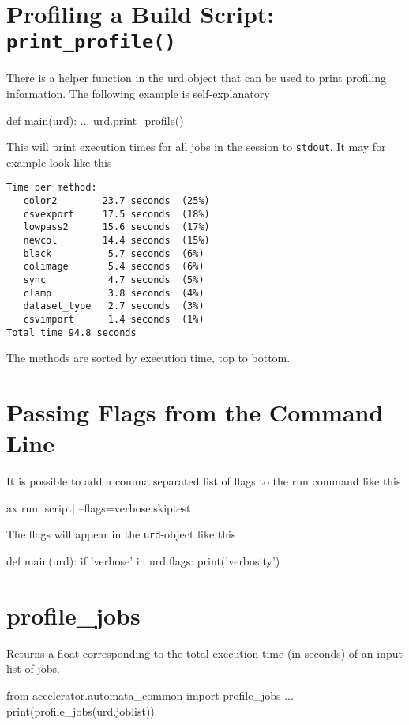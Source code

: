 \section{Profiling a Build Script:  \texttt{print\_profile()}}
There is a helper function in the urd object that can be used to print
profiling information.  The following example is self-explanatory
\begin{python}
def main(urd):
    ...
    urd.print_profile()
\end{python}
This will print execution times for all jobs in the session
to \texttt{stdout}.  It may for example look like this
\begin{verbatim}
Time per method:
   color2        23.7 seconds  (25%)
   csvexport     17.5 seconds  (18%)
   lowpass2      15.6 seconds  (17%)
   newcol        14.4 seconds  (15%)
   black          5.7 seconds  (6%)
   colimage       5.4 seconds  (6%)
   sync           4.7 seconds  (5%)
   clamp          3.8 seconds  (4%)
   dataset_type   2.7 seconds  (3%)
   csvimport      1.4 seconds  (1%)
Total time 94.8 seconds
\end{verbatim}
The methods are sorted by execution time, top to bottom.



\section{Passing Flags from the Command Line}
It is possible to add a comma separated list of flags to the run command
like this
\begin{python}
ax run [script] --flags=verbose,skiptest
\end{python}
The flags will appear in the \texttt{urd}-object like this
\begin{python}
def main(urd):
    if 'verbose' in urd.flags:
       print('verbosity')
\end{python}



\section{profile\_jobs}
Returns a float corresponding to the total execution time (in seconds)
of an input list of jobs.
\begin{python}
from accelerator.automata_common import profile_jobs
...
print(profile_jobs(urd.joblist))
\end{python}



